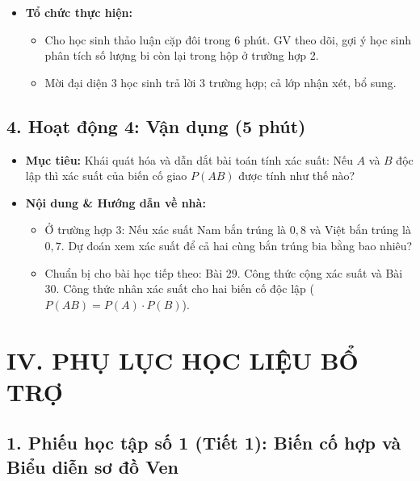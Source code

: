 \documentclass[12pt, a4paper]{article}
\begin{document}
\begin{itemize}[leftmargin=1.2cm]
    \item[d)] \textbf{Tổ chức thực hiện:}
    \begin{itemize}[leftmargin=0.6cm]
        \item Cho học sinh thảo luận cặp đôi trong 6 phút. GV theo dõi, gợi ý học sinh phân tích số lượng bi còn lại trong hộp ở trường hợp 2.
        \item Mời đại diện 3 học sinh trả lời 3 trường hợp; cả lớp nhận xét, bổ sung.
    \end{itemize}
\end{itemize}

\subsection*{4. Hoạt động 4: Vận dụng (5 phút)}

\begin{itemize}[leftmargin=1.2cm]
    \item[a)] \textbf{Mục tiêu:} Khái quát hóa và dẫn dắt bài toán tính xác suất: Nếu $A$ và $B$ độc lập thì xác suất của biến cố giao $P(AB)$ được tính như thế nào?
    \item[b)] \textbf{Nội dung & Hướng dẫn về nhà:}
    \begin{itemize}[leftmargin=0.6cm]
        \item Ở trường hợp 3: Nếu xác suất Nam bắn trúng là $0{,}8$ và Việt bắn trúng là $0{,}7$. Dự đoán xem xác suất để cả hai cùng bắn trúng bia bằng bao nhiêu?
        \item Chuẩn bị cho bài học tiếp theo: Bài 29. Công thức cộng xác suất và Bài 30. Công thức nhân xác suất cho hai biến cố độc lập ($P(AB) = P(A) \cdot P(B)$).
    \end{itemize}
\end{itemize}

\section*{IV. PHỤ LỤC HỌC LIỆU BỔ TRỢ}

\subsection*{1. Phiếu học tập số 1 (Tiết 1): Biến cố hợp và Biểu diễn sơ đồ Ven}
\end{document}
